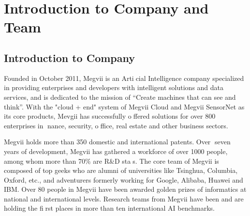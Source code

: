 \chapter{Introduction to Company and Team}
\label{sec:intro}

\section{Introduction to Company}
\label{sec:isauriam}

Founded in October 2011, Megvii is an Articial Intelligence company specialized in providing enterprises and developers with intelligent solutions and data services,
and is dedicated to the mission of “Create machines that can see and think”.
With the "cloud + end" system of Megvii Cloud and Megvii SensorNet as its core products, Mevgii has successfully offered solutions for over 800 enterprises in nance, security,
office, real estate and other business sectors.

Megvii holds more than 350 domestic and international patents. Over seven years of development, Megvii has gathered a workforce of over 1000 people, among whom more than 70\% are R&D stas. The core team of Megvii is composed of top geeks
who are alumni of universities like Tsinghua, Columbia, Oxford, etc., and adventurers formerly working for Google, Alibaba, Huawei and IBM.
Over 80 people in Megvii have been awarded golden prizes of informatics at national and international levels.
Research teams from Megvii have been and are holding the first places in more than ten international AI benchmarks.

